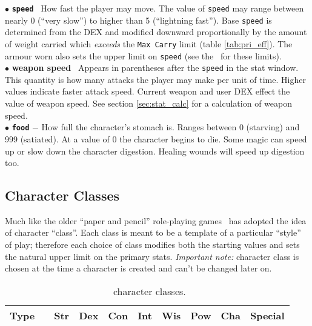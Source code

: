 $\bullet$ {\bf\tt speed} \emdash\
How fast the player may move.
The value of {\tt speed} may range between nearly 0 (``very slow'') to
higher than 5
(``lightning fast''). Base {\tt speed} is determined from the DEX and modified
downward proportionally by the amount of weight carried which {\em exceeds} the
{\tt Max Carry} limit (table \ref{tab:pri_eff}). The armour worn also sets the
upper limit on {\tt speed} (see the \spoiler\ for these limits). \\

$\bullet$ {\bf weapon speed}
\emdash\ Appears in
parentheses after the {\tt speed} in the stat window. This quantity is
how many attacks the player may make per unit of time.
Higher values indicate faster attack speed. Current weapon and user
DEX effect the value of weapon speed. See section \ref{sec:stat_calc}
for a calculation of weapon speed. \\

$\bullet$ {\bf\tt food} $-$ How full the character's stomach is.
Ranges between 0 (starving) and 999 (satiated).  At a value of 0 the
character begins to die. Some magic can speed up or slow down the
character digestion. Healing wounds will speed up digestion too. \\


\subsection{Character Classes}\label{sec:char_cls}

Much like the older ``paper and pencil'' role-playing games
\cf\ has adopted the idea of character ``class''.
Each class is meant to be a template of a particular ``style'' of play;
therefore each choice of class modifies both the starting
values and sets the natural upper limit on the primary stats.
{\em Important note:} character class is chosen at the time a
character is created and can't be changed later on.
\begin{table}
\begin{center}
\scriptsize
\caption{\cf\ character classes. \label{tab:char_cls}}
\vskip 12pt
\begin{tabular}{|c|c|l|l|l|l|l|l|l|p{4cm}|}
\hline
Type& &         Str&    Dex&    Con&    Int&    Wis&    Pow& Cha & Special\\
\hline
\hline

\hline
\end{tabular}
\end{center}
\end{table}

